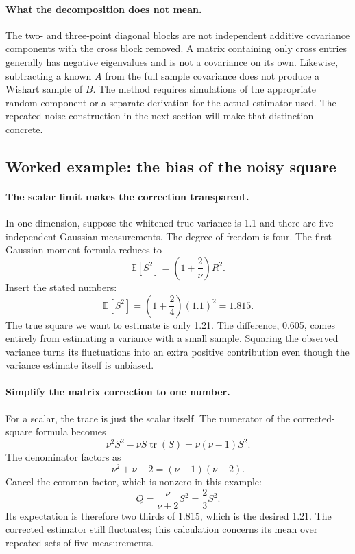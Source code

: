 \documentclass[11pt]{article}
\newcommand{\E}{\mathbb{E}}
\begin{document}
\paragraph{What the decomposition does not mean.}
The two- and three-point diagonal blocks are not independent additive
covariance components with the cross block removed. A matrix containing
only cross entries generally has negative eigenvalues and is not a
covariance on its own. Likewise, subtracting a known $A$ from the full
sample covariance does not produce a Wishart sample of $B$. The method
requires simulations of the appropriate random component or a separate
derivation for the actual estimator used. The repeated-noise construction
in the next section will make that distinction concrete.

\subsection{Worked example: the bias of the noisy square}
\label{sec:noisy-square-example}
\paragraph{The scalar limit makes the correction transparent.}
In one dimension, suppose the whitened true variance is 1.1 and there are
five independent Gaussian measurements. The degree of freedom is four.
The first Gaussian moment formula reduces to
\begin{equation}
 \E[S^2]=\left(1+\frac2\nu\right)R^2.
\end{equation}
Insert the stated numbers:
\begin{equation}
 \E[S^2]=\left(1+\frac24\right)(1.1)^2=1.815.
\end{equation}
The true square we want to estimate is only 1.21. The difference, 0.605,
comes entirely from estimating a variance with a small sample. Squaring
the observed variance turns its fluctuations into an extra positive
contribution even though the variance estimate itself is unbiased.

\paragraph{Simplify the matrix correction to one number.}
For a scalar, the trace is just the scalar itself. The numerator of the
corrected-square formula becomes
\begin{equation}
 \nu^2S^2-\nu S\operatorname{tr}(S)=\nu(\nu-1)S^2.
\end{equation}
The denominator factors as
\begin{equation}
 \nu^2+\nu-2=(\nu-1)(\nu+2).
\end{equation}
Cancel the common factor, which is nonzero in this example:
\begin{equation}
 Q=\frac{\nu}{\nu+2}S^2=\frac23S^2.
\end{equation}
Its expectation is therefore two thirds of 1.815, which is the desired
1.21. The corrected estimator still fluctuates; this calculation concerns
its mean over repeated sets of five measurements.
\end{document}
